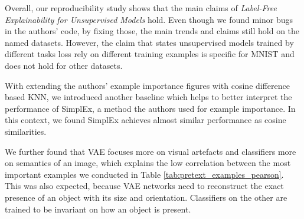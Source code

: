 
Overall, our reproducibility study shows that the main claims of  \textit{Label-Free Explainability for Unsupervised Models} \cite{crabbe2022label} hold. Even though we found minor bugs in the authors' code, by fixing those, the main trends and claims still hold on the named datasets. However, the claim that states unsupervised models trained by different tasks loss rely on different training examples is specific for MNIST and does not hold for other datasets.



\vspace{1em}

With extending the authors' example importance figures with cosine difference based KNN, we introduced another baseline which helps to better interpret the performance of SimplEx\cite{Crabbe2021Simplex}, a method the authors used for example importance. In this context, we found SimplEx achieves almost similar performance as cosine similarities.

\vspace{1em}

We further found that VAE focuses more on visual artefacts and classifiers more on semantics of an image, which explains the low correlation between the most important examples we conducted in Table \ref{tab:pretext_examples_pearson}. This was also expected, because VAE networks need to reconstruct the exact presence of an object with its size and orientation. Classifiers on the other are trained to be invariant on how an object is present.

\vspace{1em}

